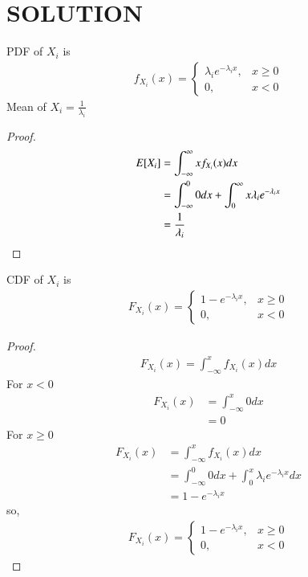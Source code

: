 \documentclass[journal,12pt,twocolumn]{IEEEtran}
\begin{document}
\section{SOLUTION}
\begin{lemma}\label{pdf and mean}
PDF of $X_i$ is
\begin{align}
    f_{X_i}(x)=\begin{cases}\lambda_i e^{-\lambda_i x}, &x\geq 0\\
                0, &x<0\nonumber
    \end{cases}    
\end{align}
Mean of $X_i=\frac{1}{\lambda_i}$\\

\end{lemma}
\begin{proof}
\begin{align}
    E[ X_i ]&=\int_{-\infty}^{\infty}x f_{X_i}(x) dx\\
              &=\int_{-\infty}^{0}0 dx + \int_{0}^{\infty}x \lambda_i e^{-\lambda_i x}\\
              &=\frac{1}{\lambda_i}\label{mean}
\end{align}
\end{proof}
\begin{lemma}\label{cdf}
  CDF of  $X_i$ is
\begin{align}
    F_{X_i}(x)=\begin{cases}1-e^{-\lambda_i x}, &x\geq 0\\
                0, &x<0\nonumber
    \end{cases}    
\end{align}
\end{lemma}
\begin{proof}
\begin{align}
   F_{X_i}(x)=\int_{-\infty}^{x}f_{X_i}(x)dx
\end{align}
For $x<0$
\begin{align}
    F_{X_i}(x)&=\int_{-\infty}^{x}0dx\\
    &=0
\end{align}
For $x\geq0$
\begin{align}
    F_{X_i}(x)&=\int_{-\infty}^{x}f_{X_i}(x)dx\\
    &=\int_{-\infty}^{0}0dx +\int_{0}^{x}\lambda_i e^{-\lambda_i x}dx\\
    &=1-e^{-\lambda_i x}
\end{align}
so,
\begin{align}
    F_{X_i}(x)=\begin{cases}1-e^{-\lambda_i x}, &x\geq 0\\
                0, &x<0\nonumber
    \end{cases}    
\end{align}
\end{proof}
\end{document}
